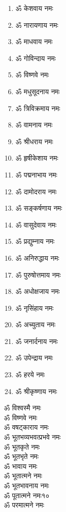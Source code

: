 \begin{center}
\begin{multicols}{2}
\begin{enumerate}
\item ॐ केशवाय नमः
\item ॐ नारायणाय नमः
\item ॐ माधवाय नमः
\item ॐ गोविन्दाय नमः
\item ॐ विष्णवे नमः	
\item ॐ मधुसूदनाय नमः
\item ॐ त्रिविक्रमाय नमः
\item ॐ वामनाय नमः
\item ॐ श्रीधराय नमः
\item ॐ हृषीकेशाय नमः
\item ॐ पद्मनाभाय नमः
\item ॐ दामोदराय नमः
\item ॐ सङ्कर्षणाय नमः
\item ॐ वासुदेवाय नमः
\item ॐ प्रद्युम्नाय नमः
\item ॐ अनिरुद्धाय नमः
\item ॐ पुरुषोत्तमाय नमः
\item ॐ अधोक्षजाय नमः
\item ॐ नृसिंहाय नमः
\item ॐ अच्युताय नमः
\item ॐ जनार्दनाय नमः
\item ॐ उपेन्द्राय नमः 
\item ॐ हरये नमः
\item ॐ श्रीकृष्णाय नमः
\end{enumerate}
\end{multicols}
{}%
\begin{multicols}{2}\setlength{\columnseprule}{1pt}
\begin{flushleft}
ॐ विश्वस्मै नमः\\
ॐ विष्णवे नमः\\
ॐ वषट्काराय नमः\\
ॐ भूतभव्यभवत्प्रभवे नमः\\
ॐ भूतकृते नमः\\
ॐ भूतभृते नमः\\
ॐ भावाय नमः\\
ॐ भूतात्मने नमः\\
ॐ भूतभावनाय नमः\\
ॐ पूतात्मने नमः\hfill १०\\
ॐ परमात्मने नमः\\

\end{flushleft}
\end{multicols}
\end{center}

